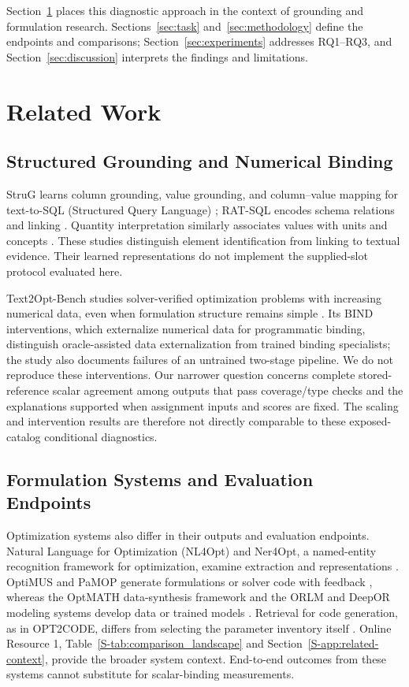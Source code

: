 \documentclass[pdflatex,iicol,sn-basic,Numbered]{sn-jnl}
\begin{document}
Section~\ref{sec:related_work} places this diagnostic approach in the context of grounding and formulation research. Sections~\ref{sec:task} and~\ref{sec:methodology} define the endpoints and comparisons; Section~\ref{sec:experiments} addresses RQ1--RQ3, and Section~\ref{sec:discussion} interprets the findings and limitations.

\section{Related Work}
\label{sec:related_work}
\subsection{Structured Grounding and Numerical Binding}
\label{subsec:rw_binding}
StruG learns column grounding, value grounding, and column--value mapping for text-to-SQL (Structured Query Language) \cite{deng2021strug}; RAT-SQL encodes schema relations and linking \cite{wang2020ratsql}. Quantity interpretation similarly associates values with units and concepts \cite{almasian2023cqe,roy2017udg}. These studies distinguish element identification from linking to textual evidence. Their learned representations do not implement the supplied-slot protocol evaluated here.

Text2Opt-Bench studies solver-verified optimization problems with increasing numerical data, even when formulation structure remains simple \cite{gao2026models}. Its BIND interventions, which externalize numerical data for programmatic binding, distinguish oracle-assisted data externalization from trained binding specialists; the study also documents failures of an untrained two-stage pipeline. We do not reproduce these interventions. Our narrower question concerns complete stored-reference scalar agreement among outputs that pass coverage/type checks and the explanations supported when assignment inputs and scores are fixed. The scaling and intervention results are therefore not directly comparable to these exposed-catalog conditional diagnostics.

\subsection{Formulation Systems and Evaluation Endpoints}
\label{subsec:rw_llm_generation}\label{subsec:rw_retrieval_memory}
Optimization systems also differ in their outputs and evaluation endpoints. Natural Language for Optimization (NL4Opt) and Ner4Opt, a named-entity recognition framework for optimization, examine extraction and representations \cite{ramamonjison2023nl4opt,kadioglu2024ner4opt}. OptiMUS and PaMOP generate formulations or solver code with feedback \cite{ahmaditeshnizi2024optimus_icml,pan2025pamop}, whereas the OptMATH data-synthesis framework and the ORLM and DeepOR modeling systems develop data or trained models \cite{lu2025optmath,huang2025orlm,xiao2026deepor}. Retrieval for code generation, as in OPT2CODE, differs from selecting the parameter inventory itself \cite{ahmed2025opt2code}. Online Resource 1, Table~\ref{S-tab:comparison_landscape} and Section~\ref{S-app:related-context}, provide the broader system context. End-to-end outcomes from these systems cannot substitute for scalar-binding measurements.
\end{document}
